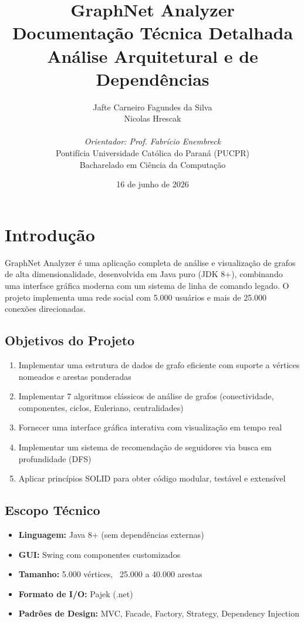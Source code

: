 \documentclass[12pt,a4paper]{article}
\title{\textbf{GraphNet Analyzer}\\
\large Documentação Técnica Detalhada\\
\normalsize Análise Arquitetural e de Dependências}
\author{
    Jafte Carneiro Fagundes da Silva\\
    Nicolas Hrescak\\
    \\
    \textit{Orientador: Prof. Fabrício Enembreck}\\
    Pontifícia Universidade Católica do Paraná (PUCPR)\\
    Bacharelado em Ciência da Computação
}
\date{16 de junho de 2026}
\begin{document}
    \maketitle
    \thispagestyle{empty}
    \newpage

    \tableofcontents
    \newpage

    \section{Introdução}

    GraphNet Analyzer é uma aplicação completa de análise e visualização de grafos de alta dimensionalidade, desenvolvida em Java puro (JDK 8+), combinando uma interface gráfica moderna com um sistema de linha de comando legado. O projeto implementa uma rede social com 5.000 usuários e mais de 25.000 conexões direcionadas.

    \subsection{Objetivos do Projeto}

    \begin{enumerate}
        \item Implementar uma estrutura de dados de grafo eficiente com suporte a vértices nomeados e arestas ponderadas
        \item Implementar 7 algoritmos clássicos de análise de grafos (conectividade, componentes, ciclos, Euleriano, centralidades)
        \item Fornecer uma interface gráfica interativa com visualização em tempo real
        \item Implementar um sistema de recomendação de seguidores via busca em profundidade (DFS)
        \item Aplicar princípios SOLID para obter código modular, testável e extensível
    \end{enumerate}

    \subsection{Escopo Técnico}

    \begin{itemize}
        \item \textbf{Linguagem:} Java 8+ (sem dependências externas)
        \item \textbf{GUI:} Swing com componentes customizados
        \item \textbf{Tamanho:} 5.000 vértices, ~25.000 a 40.000 arestas
        \item \textbf{Formato de I/O:} Pajek (.net)
        \item \textbf{Padrões de Design:} MVC, Facade, Factory, Strategy, Dependency Injection
    \end{itemize}
\end{document}
